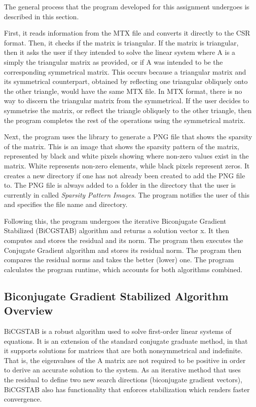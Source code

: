 \documentclass[12pt]{article}
\begin{document}
            The general process that the program developed for this assignment undergoes is described in this section. 
    
    First, it reads information from the MTX file and converts it directly to the CSR format. Then, it checks if the matrix is triangular. If the matrix is triangular, then it asks the user if they intended to solve the linear system where A is a simply the triangular matrix as provided, or if A was intended to be the corresponding symmetrical matrix. This occurs because a triangular matrix and its symmetrical counterpart, obtained by reflecting one triangular obliquely onto the other triangle, would have the same MTX file. In MTX format, there is no way to discern the triangular matrix from the symmetrical. If the user decides to symmetrise the matrix, or reflect the triangle obliquely to the other triangle, then the program completes the rest of the operations using the symmetrical matrix.

    Next, the program uses the  library to generate a PNG file that shows the sparsity of the matrix. This is an image that shows the sparsity pattern of the matrix, represented by black and white pixels showing where non-zero values exist in the matrix. White represents non-zero elements, while black pixels represent zeros. It creates a new directory if one has not already been created to add the PNG file to. The PNG file is always added to a folder in the directory that the user is currently in called \textit{Sparsity Pattern Images}. The program notifies the user of this and specifies the file name and directory.

    Following this, the program undergoes the iterative Biconjugate Gradient Stabilized (BiCGSTAB) algorithm and returns a solution vector x. It then computes and stores the residual and its norm. The program then executes the Conjugate Gradient algorithm and stores its residual norm. The program then compares the residual norms and takes the better (lower) one. The program calculates the program runtime, which accounts for both algorithms combined.

\subsection{Biconjugate Gradient Stabilized Algorithm Overview}

BiCGSTAB is a robust algorithm used to solve first-order linear systems of equations. It is an extension of the standard conjugate graduate method, in that it supports solutions for matrices that are both nonsymmetrical and indefinite. That is, the eigenvalues of the A matrix are not required to be positive in order to derive an accurate solution to the system. As an iterative method that uses the residual to define two new search directions (biconjugate gradient vectors), BiCGSTAB also has functionality that enforces stabilization which renders faster convergence.
\end{document}
